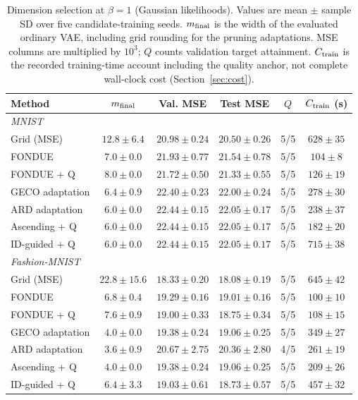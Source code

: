 \begin{table}[H]
\caption{Dimension selection at $\beta=1$ (Gaussian likelihoods). Values are mean $\pm$ sample SD over five candidate-training seeds. $m_{\rm final}$ is the width of the evaluated ordinary VAE, including grid rounding for the pruning adaptations. MSE columns are multiplied by $10^3$; $Q$ counts validation target attainment. $C_{\rm train}$ is the recorded training-time account including the quality anchor, not complete wall-clock cost (Section~\ref{sec:cost}).}\label{tab:main1}
\footnotesize
\setlength{\tabcolsep}{3.5pt}
\begin{tabular*}{\textwidth}{@{\extracolsep{\fill}}lccccc@{}}
\toprule
Method & $m_{\rm final}$ & Val. MSE & Test MSE & $Q$ & $C_{\rm train}$ (s) \\
\midrule
\multicolumn{6}{l}{\emph{MNIST}} \\
Grid (MSE) & $12.8 \pm 6.4$ & $20.98 \pm 0.24$ & $20.50 \pm 0.26$ & 5/5 & $628 \pm 35$ \\
FONDUE & $7.0 \pm 0.0$ & $21.93 \pm 0.77$ & $21.54 \pm 0.78$ & 5/5 & $104 \pm 8$ \\
FONDUE + Q & $8.0 \pm 0.0$ & $21.72 \pm 0.50$ & $21.33 \pm 0.55$ & 5/5 & $126 \pm 19$ \\
GECO adaptation & $6.4 \pm 0.9$ & $22.40 \pm 0.23$ & $22.00 \pm 0.24$ & 5/5 & $278 \pm 30$ \\
ARD adaptation & $6.0 \pm 0.0$ & $22.44 \pm 0.15$ & $22.05 \pm 0.17$ & 5/5 & $238 \pm 37$ \\
Ascending + Q & $6.0 \pm 0.0$ & $22.44 \pm 0.15$ & $22.05 \pm 0.17$ & 5/5 & $182 \pm 20$ \\
ID-guided + Q & $6.0 \pm 0.0$ & $22.44 \pm 0.15$ & $22.05 \pm 0.17$ & 5/5 & $715 \pm 38$ \\
\midrule
\multicolumn{6}{l}{\emph{Fashion-MNIST}} \\
Grid (MSE) & $22.8 \pm 15.6$ & $18.33 \pm 0.20$ & $18.08 \pm 0.19$ & 5/5 & $645 \pm 42$ \\
FONDUE & $6.8 \pm 0.4$ & $19.29 \pm 0.16$ & $19.01 \pm 0.16$ & 5/5 & $100 \pm 10$ \\
FONDUE + Q & $7.6 \pm 0.9$ & $19.00 \pm 0.33$ & $18.75 \pm 0.34$ & 5/5 & $108 \pm 15$ \\
GECO adaptation & $4.0 \pm 0.0$ & $19.38 \pm 0.24$ & $19.06 \pm 0.25$ & 5/5 & $349 \pm 27$ \\
ARD adaptation & $3.6 \pm 0.9$ & $20.67 \pm 2.75$ & $20.36 \pm 2.80$ & 4/5 & $261 \pm 19$ \\
Ascending + Q & $4.0 \pm 0.0$ & $19.38 \pm 0.24$ & $19.06 \pm 0.25$ & 5/5 & $209 \pm 26$ \\
ID-guided + Q & $6.4 \pm 3.3$ & $19.03 \pm 0.61$ & $18.73 \pm 0.57$ & 5/5 & $457 \pm 32$ \\
\bottomrule
\end{tabular*}
\end{table}
